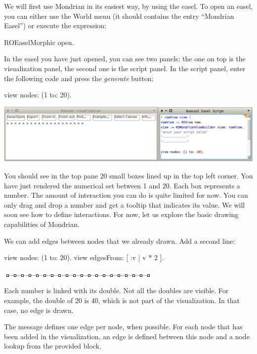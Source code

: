 \documentclass[a4paper,10pt,twoside]{book}
\begin{document}
We will first use Mondrian in its easiest way, by using the easel. To open an easel, you can either use the World menu (it should contains the entry ``Mondrian Easel'') or execute the expression:

\begin{code}{}
ROEaselMorphic open.
\end{code}


In the easel you have just opened, you can see two panels: the one on top is the visualization panel, the second one is the script panel. In the script panel, enter the following code and press the \emph{generate} button:

\begin{code}{}
view nodes: (1 to: 20).
\end{code}
\begin{center}\includegraphics[scale=0.3]{picture1}\end{center}

You should see in the top pane 20 small boxes lined up in the top left corner. You have just rendered the numerical set between 1 and 20. Each box represents a number. The amount of interaction you can do is quite limited for now. You can only drag and drop a number and get a tooltip that indicates its value. We will soon see how to define interactions. For now, let us explore the basic drawing capabilities of Mondrian.

We can add edges between nodes that we already drawn. Add a second line:

\begin{code}{}
view nodes: (1 to: 20).
view edgesFrom: [ :v | v * 2 ].
\end{code}
\begin{center}\includegraphics[scale=0.4]{picture2}\end{center}

Each number is linked with its double. Not all the doubles are visible. For example, the double of 20 is 40, which is not part of the visualization. In that case, no edge is drawn. 

The message  defines one edge per node, when possible. For each node that has been added in the visualization, an edge is defined between this node and a node lookup from the provided block.
\end{document}
